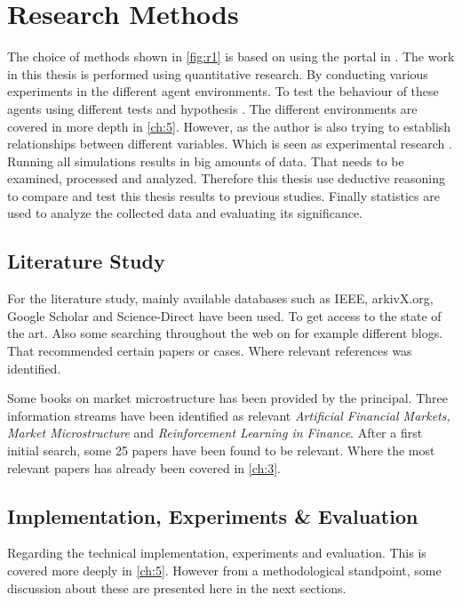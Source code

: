 \documentclass{kththesis}
\theoremstyle{definition}
\begin{document}
\section{Research Methods}
The choice of methods shown in \autoref{fig:r1} is based on using the portal in \parencite{haakansson2013portal}. The work in this thesis is performed using quantitative research. By conducting various experiments in the different agent environments. To test the behaviour of these agents using different tests and hypothesis \parencite{haakansson2013portal}. The different environments are covered in more depth in \autoref{ch:5}. However, as the author is also trying to establish relationships between different variables. Which is seen as experimental research \parencite{haakansson2013portal}.  Running all simulations results in big amounts of data. That needs to be examined, processed and analyzed. Therefore this thesis use deductive reasoning to compare and test this thesis results to previous studies. Finally statistics are used to analyze the collected data and evaluating its significance.

\subsection{Literature Study}
For the literature study, mainly available databases such as IEEE, arkivX.org, Google Scholar and Science-Direct have been used. To get access to the state of the art. Also some searching throughout the web on for example different blogs. That recommended certain papers or cases. Where relevant references was identified.

\newpage
Some books on market microstructure has been provided by the principal. Three information streams have been identified as relevant \textit{Artificial Financial Markets, Market Microstructure} and \textit{Reinforcement Learning in Finance}. After a first initial search, some 25 papers have been found to be relevant. Where the most relevant papers has already been covered in \autoref{ch:3}.

\subsection{Implementation, Experiments \& Evaluation}
Regarding the technical implementation, experiments and evaluation. This is covered more deeply in \autoref{ch:5}. However from a methodological standpoint, some discussion about these are presented here in the next sections.
\end{document}
